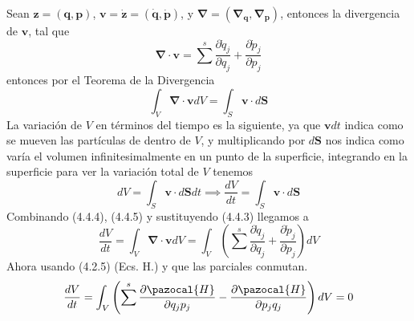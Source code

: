 Sean $\mathbf{z}=(\mathbf{q},\mathbf{p})$, $\mathbf{v}=\dot{\mathbf{z}}=(\dot{\mathbf{q}},\dot{\mathbf{p}})$, y $\mathbf{\nabla} = (\mathbf{\nabla}_\textbf{q},\mathbf{\nabla}_\textbf{p})$, entonces la divergencia de $\mathbf{v}$, tal que
\begin{equation} \label{4.3.4}
    \mathbf{\nabla} \cdot \mathbf{v} = \sum^s \frac{\partial \dot{q}_j}{\partial q_j} + \frac{\partial \dot{p}_j}{\partial p_j}
\end{equation} 
entonces por el Teorema de la Divergencia
\begin{equation} \label{4.3.5}
    \int_V{\mathbf{\nabla} \cdot \mathbf{v} dV} = \int_S \mathbf{v} \cdot d\mathbf{S}
\end{equation} 
La variación de $V$ en términos del tiempo es la siguiente, ya que $\mathbf{v}dt$ indica como se mueven las partículas de dentro de $V$, y multiplicando por $d\mathbf{S}$ nos indica como varía el volumen infinitesimalmente en un punto de la superficie, integrando en la superficie para ver la variación total de $V$ tenemos
\begin{equation} \label{4.3.6}
    dV=\int_S \mathbf{v} \cdot d\mathbf{S} dt \implies \frac{dV}{dt} = \int_S \mathbf{v} \cdot d\mathbf{S}
\end{equation} 
Combinando (4.4.4), (4.4.5) y sustituyendo (4.4.3) llegamos a 
\begin{equation} \label{4.3.7}
    \frac{dV}{dt} = \int_V{\mathbf{\nabla} \cdot \mathbf{v} dV} = \int_V{\left(\sum^s \frac{\partial \dot{q}_j}{\partial q_j} + \frac{\partial \dot{p}_j}{\partial p_j}\right)dV}
\end{equation} 
Ahora usando (4.2.5) (Ecs. H.) y que las parciales conmutan.
\begin{equation} \label{4.3.8}
    \frac{dV}{dt} = \int_V{\left(\sum^s \frac{\partial \pazocal{H}}{\partial q_j p_j} - \frac{\partial \pazocal{H}}{\partial p_j q_j}\right)dV} = 0
\end{equation} 
